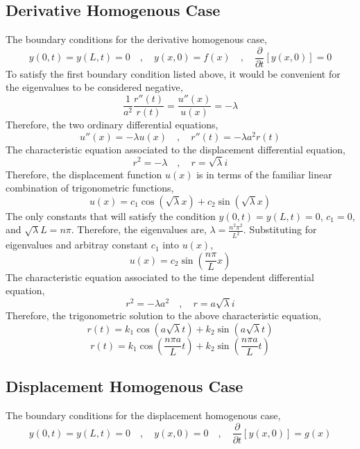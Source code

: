 \documentclass[a4paper, 12pt]{report}
\def\la{\lambda}
\def\f{\frac}
\def\l{\left}
\def\r{\right}
\def\dst{\displaystyle}
\def\p{\partial}
\begin{document}
\begin{center}
\subsection{Derivative Homogenous Case}
The boundary conditions for the derivative homogenous case,
$$y(0,t) = y(L,t) = 0\quad,\quad y(x,0) = f(x)\quad,\quad\f{\p }{\p t}[y(x,0)] = 0$$
To satisfy the first boundary condition listed above, it would be convenient for the eigenvalues to be considered negative,
$$\f{1}{a^2}\f{r''(t)}{r(t)} = \f{u''(x)}{u(x)} = -\la$$
Therefore, the two ordinary differential equations,
$$u''(x) = -\la u(x)\quad,\quad r''(t) = -\la a^2 r(t)$$
The characteristic equation associated to the displacement differential equation,
$$r^2 = -\la\quad,\quad r = \sqrt{\la}i$$
Therefore, the displacement function $u(x)$ is in terms of the familiar linear combination of trigonometric functions,
$$u(x) = c_1\cos\l(\sqrt{\la}x\r) + c_2\sin\l(\sqrt{\la}x\r)$$
The only constants that will satisfy the condition $\dst{y(0,t) = y(L,t) = 0}$, $c_1 = 0$, and $\sqrt{\la}L = n\pi$. Therefore, the eigenvalues are, $\dst{\la = \f{n^2\pi^2}{L^2}}$. Substituting for eigenvalues and arbitray constant $c_1$ into $u(x)$,
$$u(x) = c_2\sin\l(\f{n\pi}{L}x\r)$$
The characteristic equation associated to the time dependent differential equation,
$$r^2 = -\la a^2\quad,\quad r = a\sqrt{\la}i$$
Therefore, the trigonometric solution to the above characteristic equation,
$$r(t) = k_1\cos\l(a\sqrt{\la}t\r) + k_2\sin\l(a\sqrt{\la}t\r)$$
$$r(t) = k_1\cos\l(\f{n\pi a}{L}t\r) + k_2\sin\l(\f{n\pi a}{L}t\r)$$
\subsection{Displacement Homogenous Case}
The boundary conditions for the displacement homogenous case,
$$y(0,t) = y(L,t) = 0\quad,\quad y(x,0) = 0\quad,\quad\f{\p }{\p t}[y(x,0)] = g(x)$$
\end{center}
\end{document}
